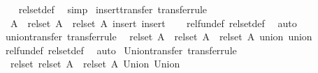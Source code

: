 \begin{isabellebody}
\ \ %
\endisadelimproof
%
\isatagproof
{}\isamarkupfalse%
\ rel{\isacharunderscore}{\kern0pt}set{\isacharunderscore}{\kern0pt}def\ \isamarkupfalse%
\ simp%
\endisatagproof
{\isafoldproof}%
%
\isadelimproof
\isanewline
%
\endisadelimproof
\isanewline
{}\isamarkupfalse%
\ insert{\isacharunderscore}{\kern0pt}transfer\ {\isacharbrackleft}{\kern0pt}transfer{\isacharunderscore}{\kern0pt}rule{\isacharbrackright}{\kern0pt}{\isacharcolon}{\kern0pt}\isanewline
\ \ {\isachardoublequoteopen}{\isacharparenleft}{\kern0pt}A\ {\isacharequal}{\kern0pt}{\isacharequal}{\kern0pt}{\isacharequal}{\kern0pt}{\isachargreater}{\kern0pt}\ rel{\isacharunderscore}{\kern0pt}set\ A\ {\isacharequal}{\kern0pt}{\isacharequal}{\kern0pt}{\isacharequal}{\kern0pt}{\isachargreater}{\kern0pt}\ rel{\isacharunderscore}{\kern0pt}set\ A{\isacharparenright}{\kern0pt}\ insert\ insert{\isachardoublequoteclose}\isanewline
%
\isadelimproof
\ \ %
\endisadelimproof
%
\isatagproof
{}\isamarkupfalse%
\ rel{\isacharunderscore}{\kern0pt}fun{\isacharunderscore}{\kern0pt}def\ rel{\isacharunderscore}{\kern0pt}set{\isacharunderscore}{\kern0pt}def\ \isamarkupfalse%
\ auto%
\endisatagproof
{\isafoldproof}%
%
\isadelimproof
\isanewline
%
\endisadelimproof
\isanewline
{}\isamarkupfalse%
\ union{\isacharunderscore}{\kern0pt}transfer\ {\isacharbrackleft}{\kern0pt}transfer{\isacharunderscore}{\kern0pt}rule{\isacharbrackright}{\kern0pt}{\isacharcolon}{\kern0pt}\isanewline
\ \ {\isachardoublequoteopen}{\isacharparenleft}{\kern0pt}rel{\isacharunderscore}{\kern0pt}set\ A\ {\isacharequal}{\kern0pt}{\isacharequal}{\kern0pt}{\isacharequal}{\kern0pt}{\isachargreater}{\kern0pt}\ rel{\isacharunderscore}{\kern0pt}set\ A\ {\isacharequal}{\kern0pt}{\isacharequal}{\kern0pt}{\isacharequal}{\kern0pt}{\isachargreater}{\kern0pt}\ rel{\isacharunderscore}{\kern0pt}set\ A{\isacharparenright}{\kern0pt}\ union\ union{\isachardoublequoteclose}\isanewline
%
\isadelimproof
\ \ %
\endisadelimproof
%
\isatagproof
{}\isamarkupfalse%
\ rel{\isacharunderscore}{\kern0pt}fun{\isacharunderscore}{\kern0pt}def\ rel{\isacharunderscore}{\kern0pt}set{\isacharunderscore}{\kern0pt}def\ \isamarkupfalse%
\ auto%
\endisatagproof
{\isafoldproof}%
%
\isadelimproof
\isanewline
%
\endisadelimproof
\isanewline
{}\isamarkupfalse%
\ Union{\isacharunderscore}{\kern0pt}transfer\ {\isacharbrackleft}{\kern0pt}transfer{\isacharunderscore}{\kern0pt}rule{\isacharbrackright}{\kern0pt}{\isacharcolon}{\kern0pt}\isanewline
\ \ {\isachardoublequoteopen}{\isacharparenleft}{\kern0pt}rel{\isacharunderscore}{\kern0pt}set\ {\isacharparenleft}{\kern0pt}rel{\isacharunderscore}{\kern0pt}set\ A{\isacharparenright}{\kern0pt}\ {\isacharequal}{\kern0pt}{\isacharequal}{\kern0pt}{\isacharequal}{\kern0pt}{\isachargreater}{\kern0pt}\ rel{\isacharunderscore}{\kern0pt}set\ A{\isacharparenright}{\kern0pt}\ Union\ Union{\isachardoublequoteclose}\isanewline

\end{isabellebody}
